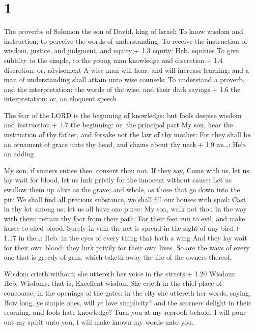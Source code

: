 \hypertarget{section}{%
\section{1}\label{section}}

 The proverbs of Solomon the son of David, king of Israel;
 To know wisdom and instruction; to perceive the words of
understanding;  To receive the instruction of wisdom,
justice, and judgment, and equity;+ 1.3 equity: Heb. equities
 To give subtilty to the simple, to the young man knowledge
and discretion.+ 1.4 discretion: or, advisement  A wise man
will hear, and will increase learning; and a man of understanding shall
attain unto wise counsels:  To understand a proverb, and the
interpretation; the words of the wise, and their dark sayings.+ 1.6 the
interpretation: or, an eloquent speech

 The fear of the LORD is the beginning of knowledge: but
fools despise wisdom and instruction.+ 1.7 the beginning: or, the
principal part  My son, hear the instruction of thy father,
and forsake not the law of thy mother:  For they shall be an
ornament of grace unto thy head, and chains about thy neck.+ 1.9
an\ldots: Heb. an adding

 My son, if sinners entice thee, consent thou not.
 If they say, Come with us, let us lay wait for blood, let
us lurk privily for the innocent without cause:  Let us
swallow them up alive as the grave; and whole, as those that go down
into the pit:  We shall find all precious substance, we
shall fill our houses with spoil:  Cast in thy lot among
us; let us all have one purse:  My son, walk not thou in
the way with them; refrain thy foot from their path:  For
their feet run to evil, and make haste to shed blood. 
Surely in vain the net is spread in the sight of any bird.+ 1.17 in
the\ldots: Heb. in the eyes of every thing that hath a wing
 And they lay wait for their own blood; they lurk privily
for their own lives.  So are the ways of every one that is
greedy of gain; which taketh away the life of the owners thereof.

 Wisdom crieth without; she uttereth her voice in the
streets:+ 1.20 Wisdom: Heb. Wisdoms, that is, Excellent wisdom
 She crieth in the chief place of concourse, in the
openings of the gates: in the city she uttereth her words, saying,
 How long, ye simple ones, will ye love simplicity? and the
scorners delight in their scorning, and fools hate knowledge?
 Turn you at my reproof: behold, I will pour out my spirit
unto you, I will make known my words unto you.

